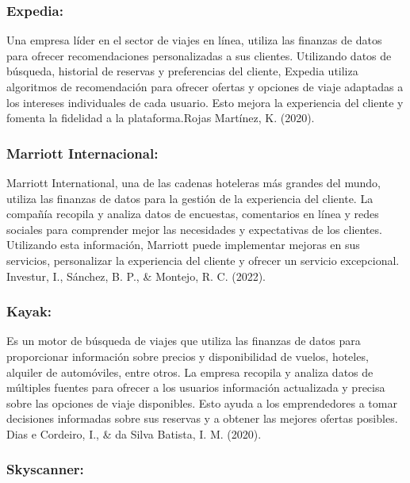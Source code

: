 \documentclass[
  letterpaper,
  DIV=11,
  numbers=noendperiod]{scrreprt}
\begin{document}
\hypertarget{expedia}{%
\subsubsection{Expedia:}\label{expedia}}

Una empresa líder en el sector de viajes en línea, utiliza las finanzas
de datos para ofrecer recomendaciones personalizadas a sus clientes.
Utilizando datos de búsqueda, historial de reservas y preferencias del
cliente, Expedia utiliza algoritmos de recomendación para ofrecer
ofertas y opciones de viaje adaptadas a los intereses individuales de
cada usuario. Esto mejora la experiencia del cliente y fomenta la
fidelidad a la plataforma.Rojas Martínez, K. (2020).

\hypertarget{marriott-internacional}{%
\subsubsection{Marriott Internacional:}\label{marriott-internacional}}

Marriott International, una de las cadenas hoteleras más grandes del
mundo, utiliza las finanzas de datos para la gestión de la experiencia
del cliente. La compañía recopila y analiza datos de encuestas,
comentarios en línea y redes sociales para comprender mejor las
necesidades y expectativas de los clientes. Utilizando esta información,
Marriott puede implementar mejoras en sus servicios, personalizar la
experiencia del cliente y ofrecer un servicio excepcional. Investur, I.,
Sánchez, B. P., \& Montejo, R. C. (2022).

\hypertarget{kayak}{%
\subsubsection{Kayak:}\label{kayak}}

Es un motor de búsqueda de viajes que utiliza las finanzas de datos para
proporcionar información sobre precios y disponibilidad de vuelos,
hoteles, alquiler de automóviles, entre otros. La empresa recopila y
analiza datos de múltiples fuentes para ofrecer a los usuarios
información actualizada y precisa sobre las opciones de viaje
disponibles. Esto ayuda a los emprendedores a tomar decisiones
informadas sobre sus reservas y a obtener las mejores ofertas posibles.
Dias e Cordeiro, I., \& da Silva Batista, I. M. (2020).

\hypertarget{skyscanner}{%
\subsubsection{Skyscanner:}\label{skyscanner}}
\end{document}
